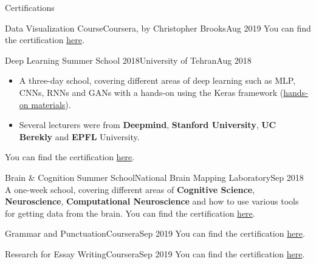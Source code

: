 \documentclass[]{mcdowellcv}
\begin{document}
\begin{cvsection}{Certifications}
			\begin{cvsubsection}{Data Visualization Course}{Coursera, by Christopher Brooks}{Aug 2019}
            You can find the certification \href{https://www.coursera.org/account/accomplishments/verify/JWAWUXXNVNWX}{here}.
    		\end{cvsubsection}
    		
    		\begin{cvsubsection}{Deep Learning Summer School 2018}{University of Tehran}{Aug 2018}
            	\begin{itemize}
            	    \item A three-day school, covering different areas of deep learning such as MLP, CNNs, RNNs and GANs with a hands-on using the Keras framework (\href{https://github.com/erfanMhi/Deep-Learning-Summer-School}{hands-on materials}).
                    \item Several lecturers were from \textbf{Deepmind}, \textbf{Stanford University}, \textbf{UC Berekly} and \textbf{EPFL} University.
            	\end{itemize}
                You can find the certification \href{https://www.dropbox.com/s/i6jnb73ydrzsjbr/Deeplearning\%20Summer\%20School.jpg?dl=0}{here}.
    		\end{cvsubsection}
    		\begin{cvsubsection}{Brain \& Cognition Summer School}{National Brain Mapping Laboratory}{Sep 2018}
                A one-week school, covering different areas of \textbf{Cognitive Science}, \textbf{Neuroscience}, \textbf{Computational Neuroscience} and how to use various tools for getting data from the brain.
                You can find the certification \href{https://www.dropbox.com/s/46kc445t36e2yzi/photo_2018-09-07_14-08-06.jpg?dl=0}{here}.
    		\end{cvsubsection}
    		
    		\begin{cvsubsection}{Grammar and Punctuation}{Coursera}{Sep 2019}
                 You can find the certification \href{https://www.coursera.org/account/accomplishments/verify/3SZUUC77CCV7}{here}.
            \end{cvsubsection}     
            \begin{cvsubsection}{Research for Essay Writing}{Coursera}{Sep 2019}
                You can find the certification \href{https://www.coursera.org/account/accomplishments/verify/KPHH92Z6ZEXY}{here}.
            \end{cvsubsection}    
    \end{cvsection}
\end{document}
